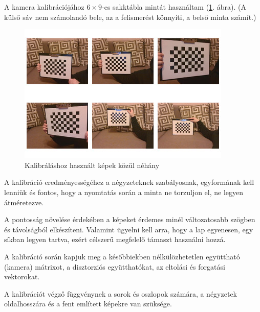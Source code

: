 

A kamera kalibrációjához $6 \times 9$-es sakktábla mintát használtam (\ref{fig:calibration}. ábra). (A külső sáv nem számolandó bele, az a felismerést könnyíti, a belső minta számít.)

\begin{figure}[htp]
	\centering
	\includegraphics[scale=1]{images/calibration.jpg}
	\caption{Kalibráláshoz használt képek közül néhány}
	\label{fig:calibration}
\end{figure}

A kalibráció eredményességéhez a négyzeteknek szabályosnak, egyformának kell lenniük és fontos, hogy a nyomtatás során a minta ne torzuljon el, ne legyen átméretezve.

A pontosság növelése érdekében a képeket érdemes minél változatosabb szögben és távolságból elkészíteni. Valamint ügyelni kell arra, hogy a lap egyenesen, egy síkban legyen tartva, ezért célszerű megfelelő támaszt használni hozzá.

A kalibráció során kapjuk meg a későbbiekben nélkülözhetetlen együttható (kamera) mátrixot, a disztorziós együtthatókat, az eltolási és forgatási vektorokat.

A kalibrációt végző függvénynek a sorok és oszlopok számára, a négyzetek oldalhosszára és a fent említett képekre van szüksége.


